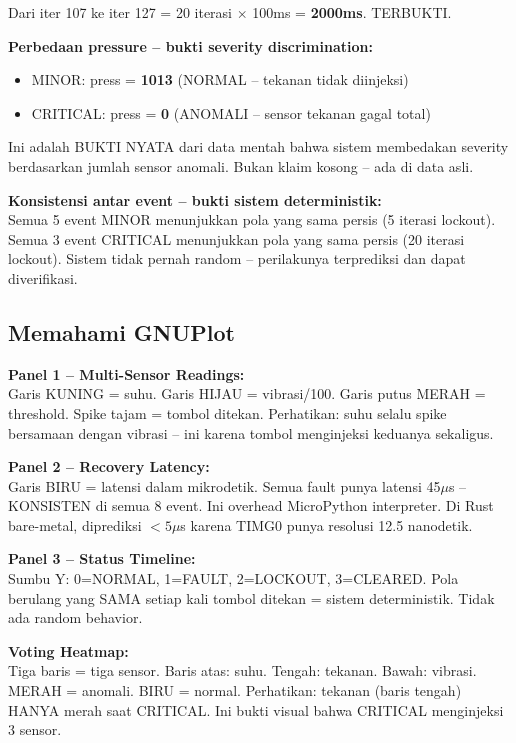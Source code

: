 \documentclass[12pt,a4paper]{article}
\begin{document}
Dari iter 107 ke iter 127 = 20 iterasi $\times$ 100ms = \textbf{2000ms}. TERBUKTI.

\textbf{Perbedaan pressure -- bukti severity discrimination:}
\begin{itemize}[nosep]
    \item MINOR: press = \textbf{1013} (NORMAL -- tekanan tidak diinjeksi)
    \item CRITICAL: press = \textbf{0} (ANOMALI -- sensor tekanan gagal total)
\end{itemize}

Ini adalah BUKTI NYATA dari data mentah bahwa sistem membedakan severity
berdasarkan jumlah sensor anomali. Bukan klaim kosong -- ada di data asli.

\textbf{Konsistensi antar event -- bukti sistem deterministik:}\\
Semua 5 event MINOR menunjukkan pola yang sama persis (5 iterasi lockout).
Semua 3 event CRITICAL menunjukkan pola yang sama persis (20 iterasi lockout).
Sistem tidak pernah random -- perilakunya terprediksi dan dapat diverifikasi.

\subsection{Memahami GNUPlot}

\textbf{Panel 1 -- Multi-Sensor Readings:}\\
Garis KUNING = suhu. Garis HIJAU = vibrasi/100. Garis putus MERAH = threshold.
Spike tajam = tombol ditekan. Perhatikan: suhu selalu spike bersamaan dengan
vibrasi -- ini karena tombol menginjeksi keduanya sekaligus.

\textbf{Panel 2 -- Recovery Latency:}\\
Garis BIRU = latensi dalam mikrodetik. Semua fault punya latensi 45$\mu$s --
KONSISTEN di semua 8 event. Ini overhead MicroPython interpreter. Di Rust
bare-metal, diprediksi $< 5\mu$s karena TIMG0 punya resolusi 12.5 nanodetik.

\textbf{Panel 3 -- Status Timeline:}\\
Sumbu Y: 0=NORMAL, 1=FAULT, 2=LOCKOUT, 3=CLEARED. Pola berulang yang SAMA
setiap kali tombol ditekan = sistem deterministik. Tidak ada random behavior.

\textbf{Voting Heatmap:}\\
Tiga baris = tiga sensor. Baris atas: suhu. Tengah: tekanan. Bawah: vibrasi.
MERAH = anomali. BIRU = normal. Perhatikan: tekanan (baris tengah) HANYA merah
saat CRITICAL. Ini bukti visual bahwa CRITICAL menginjeksi 3 sensor.
\end{document}
